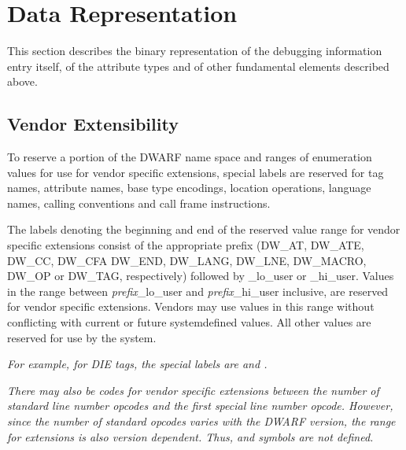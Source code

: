 \chapter{Data Representation}
\label{datarep:datarepresentation}

This section describes the binary representation of the
debugging information entry itself, of the attribute types
and of other fundamental elements described above.

\section{Vendor Extensibility}
\label{datarep:vendorextensibility}

To 
reserve a portion of the DWARF name space and ranges of
enumeration values for use for vendor specific extensions,
special labels are reserved for tag names, attribute names,
base type encodings, location operations, language names,
calling conventions and call frame instructions.

The labels denoting the beginning and end of the 
\hypertarget{chap:DWXXXlohiuser}{reserved value range}
for vendor specific extensions consist of the
appropriate prefix 
(\DWATlouserMARK{}\DWAThiuserMARK{}DW\_AT,
\DWATElouserMARK{}\DWATEhiuserMARK{}	DW\_ATE, 
\DWCClouserMARK{}\DWCChiuserMARK{}	DW\_CC,
\DWCFAlouserMARK{}\DWCFAhiuserMARK{}	DW\_CFA 
\DWENDlouserMARK{}\DWENDhiuserMARK{}	DW\_END, 
\DWLANGlouserMARK{}\DWLANGhiuserMARK{}  DW\_LANG, 
\DWLNElouserMARK{}\DWLNEhiuserMARK{}	DW\_LNE, 
\DWMACROlouserMARK{}\DWMACROhiuserMARK{}DW\_MACRO,
\DWOPlouserMARK{}\DWOPhiuserMARK{}	DW\_OP or
\DWTAGlouserMARK{}\DWTAGhiuserMARK{}	DW\_TAG, 
respectively) followed by
\_lo\_user or \_hi\_user. 
Values in the  range between \textit{prefix}\_lo\_user 
and \textit{prefix}\_hi\_user inclusive,
are reserved for vendor specific extensions. Vendors may
use values in this range without conflicting with current or
future system\dash defined values. All other values are reserved
for use by the system.

\textit{For example, for DIE tags, the special
labels are \DWTAGlouserNAME{} and \DWTAGhiuserNAME.}

\textit{There may also be codes for vendor specific extensions
between the number of standard line number opcodes and
the first special line number opcode. However, since the
number of standard opcodes varies with the DWARF version,
the range for extensions is also version dependent. Thus,
\DWLNSlouserTARG{} and 
\DWLNShiuserTARG{} symbols are not defined.
}

